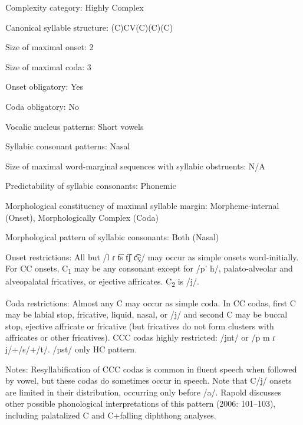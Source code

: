 {\begin{appendixdesc}
\item[Complexity category:] Highly Complex

\item[Canonical syllable structure:] (C)CV(C)(C)(C) \citep[91--112]{Rapold2006}

\item[Size of maximal onset:] 2

\item[Size of maximal coda:] 3

\item[Onset obligatory:] Yes

\item[Coda obligatory:] No

\item[Vocalic nucleus patterns:] Short vowels

\item[Syllabic consonant patterns:] Nasal

\item[Size of maximal word-marginal sequences with syllabic obstruents:] N/A

\item[Predictability of syllabic consonants:] Phonemic

\item[Morphological constituency of maximal syllable margin:] Morpheme-internal (Onset), Morphologically Complex (Coda)

\item[Morphological pattern of syllabic consonants:] Both (Nasal)

\item[Onset restrictions:] All but /l ɾ t͡s t͡ʃ c͡ç/ may occur as simple onsets word-initially. For CC onsets, C\textsubscript{1} may be any consonant except for /p’ h/, palato-alveolar and alveopalatal fricatives, or ejective affricates. C\textsubscript{2} is /j/.

\item[Coda restrictions:] Almost any C may occur as simple coda. In CC codas, first C may be labial stop, fricative, liquid, nasal, or /j/ and second C may be buccal stop, ejective affricate or fricative (but fricatives do not form clusters with affricates or other fricatives). CCC codas highly restricted: /jnt/ or /p m ɾ j/+/s/+/t/. /pst/ only HC pattern.

\item[Notes:] Resyllabification of CCC codas is common in fluent speech when followed by vowel, but these codas do sometimes occur in speech. Note that C/j/ onsets are limited in their distribution, occurring only before /a/. Rapold discusses other possible phonological interpretations of this pattern (2006: 101--103), including palatalized C and C+falling diphthong analyses.
\end{appendixdesc}
}
